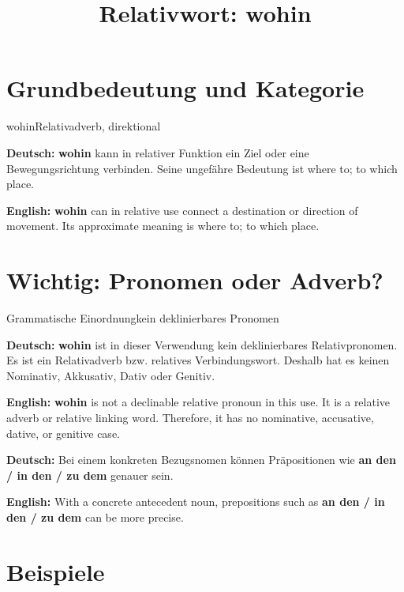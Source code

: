 \documentclass[a4paper,11pt]{article}
\title{Relativwort: \glqq wohin\grqq{}}
\date{}
\newcommand{\GermanText}[1]{\textbf{Deutsch: }#1\par}
\newcommand{\EnglishText}[1]{{\small\color{SoftGray}\textbf{English: }#1\par}}
\begin{document}
\maketitle

\tableofcontents

\newpage

\section{Grundbedeutung und Kategorie}

\begin{grammarentry}{wohin}{Relativadverb, direktional}

\GermanText{\textbf{wohin} kann in relativer Funktion ein Ziel oder eine Bewegungsrichtung verbinden. Seine ungefähre Bedeutung ist \glqq where to; to which place\grqq{}.}

\EnglishText{\textbf{wohin} can in relative use connect a destination or direction of movement. Its approximate meaning is \glqq where to; to which place\grqq{}.}

\end{grammarentry}

\section{Wichtig: Pronomen oder Adverb?}

\begin{grammarentry}{Grammatische Einordnung}{kein deklinierbares Pronomen}

\GermanText{\textbf{wohin} ist in dieser Verwendung kein deklinierbares Relativpronomen. Es ist ein Relativadverb bzw. relatives Verbindungswort. Deshalb hat es keinen Nominativ, Akkusativ, Dativ oder Genitiv.}

\EnglishText{\textbf{wohin} is not a declinable relative pronoun in this use. It is a relative adverb or relative linking word. Therefore, it has no nominative, accusative, dative, or genitive case.}

\GermanText{Bei einem konkreten Bezugsnomen können Präpositionen wie \textbf{an den / in den / zu dem} genauer sein.}

\EnglishText{With a concrete antecedent noun, prepositions such as \textbf{an den / in den / zu dem} can be more precise.}

\end{grammarentry}

\section{Beispiele}
\end{document}
